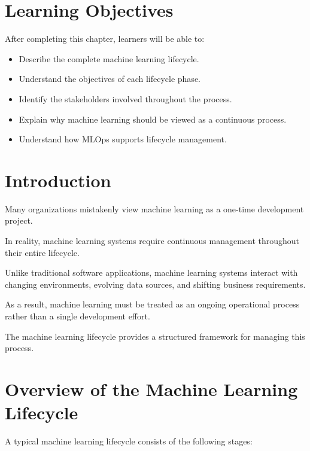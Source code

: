 
\label{chap:ml-lifecycle}

\section{Learning Objectives}

After completing this chapter, learners will be able to:

\begin{itemize}
    \item Describe the complete machine learning lifecycle.
    \item Understand the objectives of each lifecycle phase.
    \item Identify the stakeholders involved throughout the process.
    \item Explain why machine learning should be viewed as a continuous process.
    \item Understand how MLOps supports lifecycle management.
\end{itemize}

\section{Introduction}

Many organizations mistakenly view machine learning as a one-time development project.

In reality, machine learning systems require continuous management throughout their entire lifecycle.

Unlike traditional software applications, machine learning systems interact with changing environments, evolving data sources, and shifting business requirements.

As a result, machine learning must be treated as an ongoing operational process rather than a single development effort.

The machine learning lifecycle provides a structured framework for managing this process.

\section{Overview of the Machine Learning Lifecycle}

A typical machine learning lifecycle consists of the following stages:

